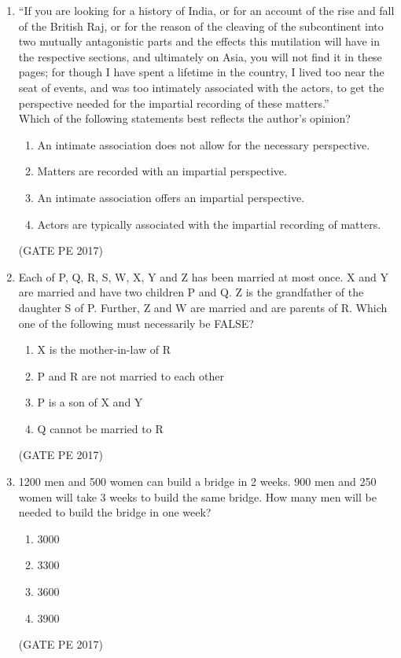 \documentclass[journal,12pt,onecolumn]{IEEEtran}
\theoremstyle{remark}
\begin{document}
\begin{enumerate}[start=1, label={Q\arabic*.}]
\item ``If you are looking for a history of India, or for an account of the rise and fall of the British Raj, or for the reason of the cleaving of the subcontinent into two mutually antagonistic parts and the effects this mutilation will have in the respective sections, and ultimately on Asia, you will not find it in these pages; for though I have spent a lifetime in the country, I lived too near the seat of events, and was too intimately associated with the actors, to get the perspective needed for the impartial recording of these matters.''\\
Which of the following statements best reflects the author’s opinion?
\begin{enumerate}
\item An intimate association does not allow for the necessary perspective.
\item Matters are recorded with an impartial perspective.
\item An intimate association offers an impartial perspective.
\item Actors are typically associated with the impartial recording of matters.
\end{enumerate}
\hfill{(GATE PE 2017)}

\item Each of P, Q, R, S, W, X, Y and Z has been married at most once. X and Y are married and have two children P and Q. Z is the grandfather of the daughter S of P. Further, Z and W are married and are parents of R. Which one of the following must necessarily be FALSE?
\begin{enumerate}
\item X is the mother-in-law of R
\item P and R are not married to each other
\item P is a son of X and Y
\item Q cannot be married to R
\end{enumerate}
\hfill{(GATE PE 2017)}

\item 1200 men and 500 women can build a bridge in 2 weeks. 900 men and 250 women will take 3 weeks to build the same bridge. How many men will be needed to build the bridge in one week?
\begin{enumerate}
\item 3000
\item 3300
\item 3600
\item 3900
\end{enumerate}
\hfill{(GATE PE 2017)}


\end{enumerate}
\end{document}
